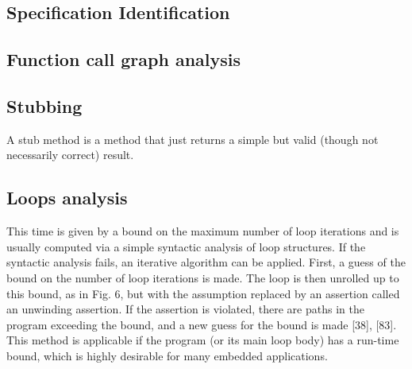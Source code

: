 \subsection{Specification Identification}

\subsection{Function call graph analysis}

\subsection{Stubbing}
A stub method is a method that just returns a simple but valid (though not necessarily correct) result.

\subsection{Loops analysis}
This time is given by a bound on the maximum number of loop iterations and is usually computed via a simple syntactic analysis of loop structures. If the syntactic analysis fails, an iterative algorithm can be applied. First, a guess of the bound on the number of loop iterations is made. The loop is then unrolled up to this bound, as in Fig. 6, but with the assumption replaced by an assertion called an unwinding assertion. If the assertion is violated, there are paths in the program exceeding the bound, and a new guess for the bound is made [38], [83]. This method is applicable if the program (or its main loop body) has a run-time bound, which is highly desirable for many embedded applications.